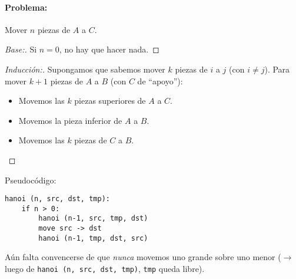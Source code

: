 \documentclass[english, spanish, fleqn, 10pt]{article}
\newcommand{\comillas}[1]{``#1''}
\numberwithin{equation}{section}
\theoremstyle{definition}
\begin{document}
\paragraph{Problema:} Mover $n$ piezas de $A$ a $C$.

\begin{proof}[Base:]
	Si $n=0$, no hay que hacer nada.
\end{proof}

\begin{proof}[Inducción:]
	Supongamos que sabemos mover $k$ piezas de $i$ a $j$ (con $i\ne j$). Para mover $k+1$ piezas de $A$ a $B$ (con $C$ de \comillas{apoyo}):
	\begin{itemize}
		\item Movemos las $k$ piezas superiores de $A$ a $C$.
		
		\item Movemos la pieza inferior de $A$ a $B$.
		
		\item Movemos las $k$ piezas de $C$ a $B$.
	\end{itemize}
\end{proof}

Pseudocódigo:
\begin{lstlisting}
hanoi (n, src, dst, tmp):
	if n > 0:
		hanoi (n-1, src, tmp, dst)
		move src -> dst
		hanoi (n-1, tmp, dst, src)
\end{lstlisting}

Aún falta convencerse de que \emph{nunca} movemos uno grande sobre uno menor ($\rightarrow$ luego de \texttt{hanoi (n, src, dst, tmp)}, \texttt{tmp} queda libre).
\end{document}
